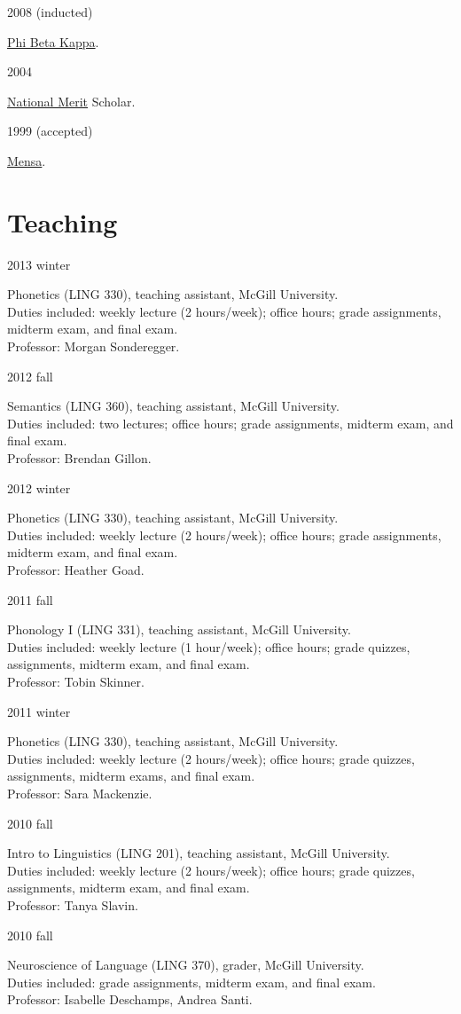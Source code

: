 \documentclass[11pt,letterpaper]{article}
\newcommand{\cvitem}[2]{%
  \begin{minipage}[t]{0.24\textwidth}
    #1 %
  \end{minipage}
  \hfill
  \begin{minipage}[t]{0.74\textwidth}
    #2 %
  \end{minipage}
}
\newcommand{\tadetails}[2]{%
  {\footnotesize Duties included: #1. \\ Professor: #2.}
}
\begin{document}
\cvitem{2008 (inducted)}{\href{http://www.pbk.org/}{Phi Beta Kappa}.}

\cvitem{2004}{\href{http://www.nationalmerit.org/}{National Merit} Scholar.}

\cvitem{1999 (accepted)}{\href{http://www.mensa.org/}{Mensa}.}



\section*{Teaching}

\cvitem{2013 winter}{Phonetics (LING 330), teaching assistant, McGill
  University. \\ \tadetails{weekly lecture (2 hours/week); office hours; grade
  assignments, midterm exam, and final exam}{Morgan Sonderegger}}

\cvitem{2012 fall}{Semantics (LING 360), teaching assistant, McGill University.
  \\ \tadetails{two lectures; office hours; grade assignments, midterm exam,
  and final exam}{Brendan Gillon}}

\cvitem{2012 winter}{Phonetics (LING 330), teaching assistant, McGill
  University. \\ \tadetails{weekly lecture (2 hours/week); office hours; grade
  assignments, midterm exam, and final exam}{Heather Goad}}

\cvitem{2011 fall}{Phonology I (LING 331), teaching assistant, McGill
  University. \\ \tadetails{weekly lecture (1 hour/week); office hours; grade
  quizzes, assignments, midterm exam, and final exam}{Tobin Skinner}}

\cvitem{2011 winter}{Phonetics (LING 330), teaching assistant, McGill
  University. \\ \tadetails{weekly lecture (2 hours/week); office hours; grade
  quizzes, assignments, midterm exams, and final exam}{Sara Mackenzie}}

\cvitem{2010 fall}{Intro to Linguistics (LING 201), teaching assistant, McGill
  University. \\ \tadetails{weekly lecture (2 hours/week); office hours; grade
  quizzes, assignments, midterm exam, and final exam}{Tanya Slavin}}

\cvitem{2010 fall}{Neuroscience of Language (LING 370), grader, McGill
  University. \\ \tadetails{grade assignments, midterm exam, and final
  exam}{Isabelle Deschamps, Andrea Santi}}
\end{document}
